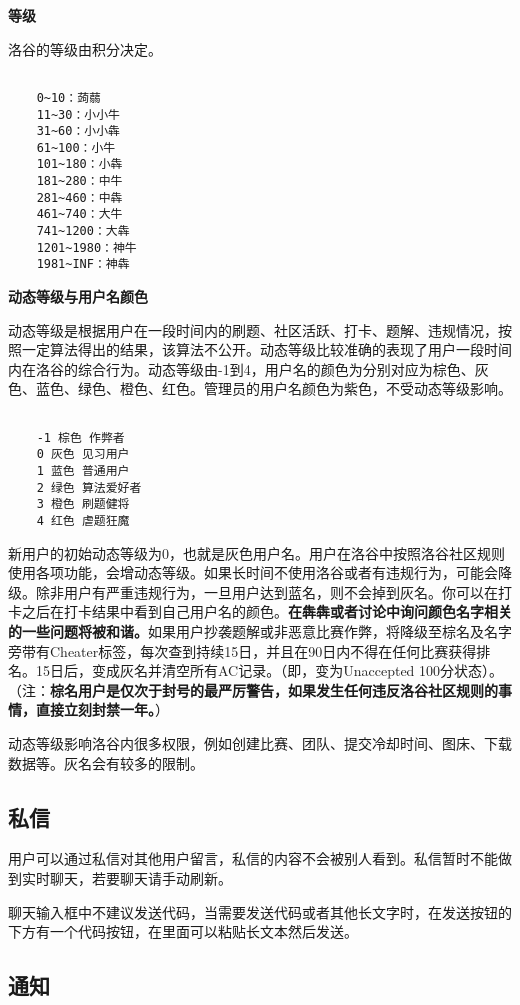 \documentclass[10pt,a4paper]{article}
\begin{document}
	\textbf{{
			等级}}
	
	
	洛谷的等级由积分决定。
	\begin{verbatim}
	
	0~10：蒟蒻  
	11~30：小小牛  
	31~60：小小犇
	61~100：小牛
	101~180：小犇
	181~280：中牛
	281~460：中犇
	461~740：大牛
	741~1200：大犇
	1201~1980：神牛
	1981~INF：神犇\end{verbatim}
	
	\textbf{{
			动态等级与用户名颜色}}
	
	
	动态等级是根据用户在一段时间内的刷题、社区活跃、打卡、题解、违规情况，按照一定算法得出的结果，该算法不公开。动态等级比较准确的表现了用户一段时间内在洛谷的综合行为。动态等级由-1到4，用户名的颜色为分别对应为棕色、灰色、蓝色、绿色、橙色、红色。管理员的用户名颜色为紫色，不受动态等级影响。
	\begin{verbatim}
	
	-1 棕色 作弊者
	0 灰色 见习用户 
	1 蓝色 普通用户 
	2 绿色 算法爱好者
	3 橙色 刷题健将
	4 红色 虐题狂魔\end{verbatim}
	
	
	新用户的初始动态等级为0，也就是灰色用户名。用户在洛谷中按照洛谷社区规则使用各项功能，会增动态等级。如果长时间不使用洛谷或者有违规行为，可能会降级。除非用户有严重违规行为，一旦用户达到蓝名，则不会掉到灰名。你可以在打卡之后在打卡结果中看到自己用户名的颜色。\textbf{{在犇犇或者讨论中询问颜色名字相关的一些问题将被和谐。}}如果用户抄袭题解或非恶意比赛作弊，将降级至棕名及名字旁带有Cheater标签，每次查到持续15日，并且在90日内不得在任何比赛获得排名。15日后，变成灰名并清空所有AC记录。（即，变为Unaccepted 
	100分状态）。（注：\textbf{{棕名用户是仅次于封号的最严厉警告，如果发生任何违反洛谷社区规则的事情，直接立刻封禁一年。}}）
	
	
	动态等级影响洛谷内很多权限，例如创建比赛、团队、提交冷却时间、图床、下载数据等。灰名会有较多的限制。
	
	\subsection{
		私信}
	
	
	用户可以通过私信对其他用户留言，私信的内容不会被别人看到。私信暂时不能做到实时聊天，若要聊天请手动刷新。
	
	
	聊天输入框中不建议发送代码，当需要发送代码或者其他长文字时，在发送按钮的下方有一个代码按钮，在里面可以粘贴长文本然后发送。
	
	\subsection{
		通知}
	
\end{document}
